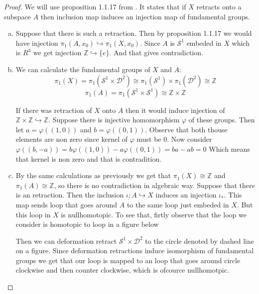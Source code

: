 \documentclass[11pt, a4paper, final]{amsart}
\newcommand{\Z}{{\mathbb{Z}}}
\newcommand{\sphere}{\mathcal{S}}
\newcommand{\disk}{\mathcal{D}}
\numberwithin{theorem}{section}
\theoremstyle{definition}
\theoremstyle{remark}
\begin{document}
\begin{proof}

    We will use proposition 1.1.17 from \cite{AH}. It states that if $X$ retracts onto 
    a subspace $A$ then inclusion map induces an injection map of fundamental groups.

    \begin{enumerate}[(a)]
        \item Suppose that there is such a retraction. Then by proposition 1.1.17 we would have
        injection $\pi_1(A,x_0) \hookrightarrow  \pi_1(X,x_0)$. Since $A$ is $\sphere^1$ embeded in 
        $X$ which is $R^3$ we get injection $\Z \hookrightarrow \{e\}$. And that gives contradiction.

        \item We can calculate the fundamental groups of $X$ and $A$:
            $$\pi_1(X) = \pi_1(\sphere^1 \times \disk^2) \cong \pi_1(\sphere^1) \times \pi_1(\disk^2) \cong  \Z$$
            $$\pi_1(A) = \pi_1(\sphere^1 \times \sphere^1) \cong \Z \times \Z$$

        If there was retraction of $X$ onto $A$ then it would induce injection of $\Z \times \Z \hookrightarrow \Z$.
        Suppose there is injective homomorphism $\varphi$ of these groups. Then let $a = \varphi((1,0))$ and $b = \varphi((0,1))$.
        Observe that both thouse elements are non zero since kernel of $\varphi$ must be $0$. Now consider $\varphi((b,-a)) = b\varphi((1,0)) - a\varphi((0,1)) = ba - ab = 0 $
        Which means that kernel is non zero and that is contradition. 

        \item  By the same calculations as previously we get that $\pi_1(X) \cong \Z$  and $\pi_1(A) \cong \Z$, so 
        there is no contradiction in algebraic way. Suppose that there is an retraction. Then the inclusion $\iota : A \hookrightarrow X$
        induces an injection $\iota_{*}$. This map sends loop that goes around $A$ to the same loop just embeded in $X$. But this loop in $X$ is nullhomotopic.
        To see that, firtly observe that the loop we consider is homotopic to loop in a figure below
        \begin{center}
            
        \end{center}

        Then we can deformation retract $\sphere^1 \times \disk^2$ to the circle denoted by dashed line on a figure.
        Since deformation retractions induce isomorphism of fundamental groups we get that our loop is mapped to an loop that goes around circle clockwise
        and then counter clockwise, which is ofcource nullhomotpic. 
        

\end{enumerate}
\end{proof}
\end{document}
